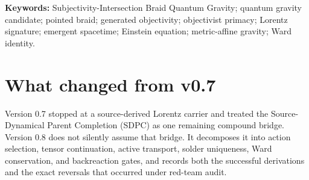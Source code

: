 \documentclass[11pt]{article}
\theoremstyle{definition}
\theoremstyle{remark}
\begin{document}
\begin{abstract}
The theorem is scoped. The finite-to-continuum residual is proved only as $O(h)$, although every odd midpoint Bregman term cancels exactly. The unmodified full finite Umegaki/Jeffreys action fails the tested one-link reflection-positivity condition. A source-native GKSL evolution admits an exact right-tail Stinespring realization and an exact conserved total temporal charge, but the three tested spatial defects lie outside the environment-only charge range. Thus full finite Lorentzian backreaction and four-component discrete total Ward balance remain open. The results refute the universal necessity thesis of \emph{objectivist primacy} by construction; they do not refute mind-independent reality, establish phenomenal consciousness, or show that nature realizes the model.
\end{abstract}

\noindent\textbf{Keywords:} Subjectivity-Intersection Braid Quantum Gravity; quantum gravity candidate; pointed braid; generated objectivity; objectivist primacy; Lorentz signature; emergent spacetime; Einstein equation; metric-affine gravity; Ward identity.

\section{What changed from v0.7}

Version 0.7 stopped at a source-derived Lorentz carrier and treated the Source-Dynamical Parent Completion (SDPC) as one remaining compound bridge. Version 0.8 does not silently assume that bridge. It decomposes it into action selection, tensor continuation, active transport, solder uniqueness, Ward conservation, and backreaction gates, and records both the successful derivations and the exact reversals that occurred under red-team audit.
\end{document}
